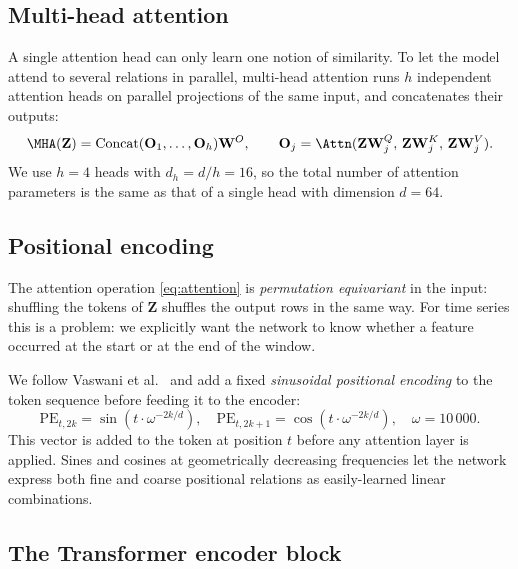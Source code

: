\subsection{Multi-head attention}
\label{sec:mha-theory}

A single attention head can only learn one notion of similarity. To
let the model attend to several relations in parallel, multi-head
attention runs $h$ independent attention heads on parallel projections
of the same input, and concatenates their outputs:
\begin{equation}
    \MHA(\mathbf{Z}) = \mathrm{Concat}(\mathbf{O}_1, \dots, \mathbf{O}_h) \mathbf{W}^O,
    \qquad
    \mathbf{O}_j = \Attn(\mathbf{Z} \mathbf{W}_j^Q,\, \mathbf{Z} \mathbf{W}_j^K,\, \mathbf{Z} \mathbf{W}_j^V).
    \label{eq:mha}
\end{equation}
We use $h=4$ heads with $d_h = d / h = 16$, so the total number of
attention parameters is the same as that of a single head with
dimension $d=64$.

\subsection{Positional encoding}
\label{sec:posenc-theory}

The attention operation \cref{eq:attention} is \emph{permutation
equivariant} in the input: shuffling the tokens of $\mathbf{Z}$
shuffles the output rows in the same way. For time series this is a
problem: we explicitly want the network to know whether a feature
occurred at the start or at the end of the window.

We follow Vaswani et al.\ \cite{vaswani2017attention} and add a fixed
\emph{sinusoidal positional encoding} to the token sequence before
feeding it to the encoder:
\begin{equation}
    \mathrm{PE}_{t, 2k}   = \sin\!\left( t \cdot \omega^{-2k/d} \right),
    \quad
    \mathrm{PE}_{t, 2k+1} = \cos\!\left( t \cdot \omega^{-2k/d} \right),
    \quad
    \omega = 10\,000.
    \label{eq:posenc}
\end{equation}
This vector is added to the token at position $t$ before any attention
layer is applied. Sines and cosines at geometrically decreasing
frequencies let the network express both fine and coarse positional
relations as easily-learned linear combinations.

\subsection{The Transformer encoder block}
\label{sec:encoder-theory}

